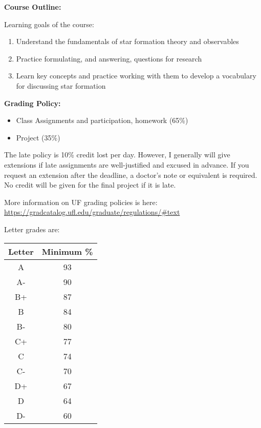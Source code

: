 \documentclass[11pt]{article}
\begin{document}
\noindent \textbf{Course Outline:}
\begin{center}
\begin{minipage}{5in}
\begin{flushleft}
    Learning goals of the course:
    \begin{enumerate}
        \item Understand the fundamentals of star formation theory and observables
        \item Practice formulating, and answering, questions for research
        \item Learn key concepts and practice working with them to develop a vocabulary for discussing star formation
    \end{enumerate}
\end{flushleft}
\end{minipage}
\end{center}


\vspace*{.15in}
\noindent\textbf{Grading Policy:}
\begin{itemize}
    \item Class Assignments and participation, homework (65\%)
    \item Project (35\%)
\end{itemize}

The late policy is 10\% credit lost per day.
However, I generally will give extensions if late assignments are well-justified and excused in advance.
If you request an extension after the deadline, a doctor's note or equivalent is required.
No credit will be given for the final project if it is late.


More information on UF grading policies is here:
\url{https://gradcatalog.ufl.edu/graduate/regulations/#text}


Letter grades are: \\
\begin{tabular}{|c|c|}
    \hline
    Letter & Minimum \% \\
    \hline
    A & 93 \\
    A- & 90 \\
    B+ & 87 \\
    B & 84 \\
    B- & 80 \\
    C+ & 77 \\
    C & 74 \\
    C- & 70 \\
    D+ & 67 \\
    D & 64 \\
    D- & 60 \\
    \hline
\end{tabular}
\end{document}
